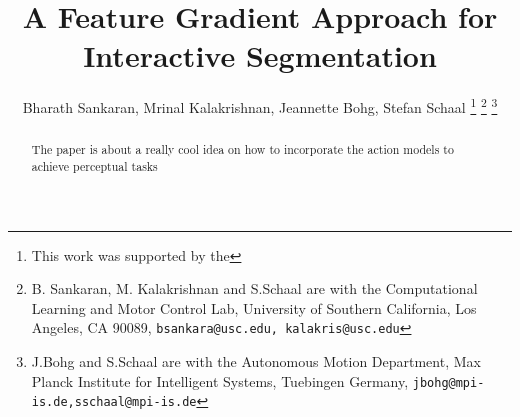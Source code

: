 \documentclass[letterpaper, 10pt, conference]{ieeeconf}
\begin{document}
\title{\LARGE \bf A Feature Gradient Approach for Interactive Segmentation}

\author{Bharath Sankaran, Mrinal Kalakrishnan, Jeannette Bohg, Stefan Schaal%
\thanks{This work was supported by the }%
\thanks{B. Sankaran, M. Kalakrishnan and S.Schaal are with the Computational Learning and Motor Control Lab, University of Southern California, Los Angeles, CA 90089, {\tt\small bsankara@usc.edu, kalakris@usc.edu}}%
\thanks{J.Bohg and S.Schaal are with the Autonomous Motion Department, Max Planck Institute for Intelligent Systems, Tuebingen Germany, {\tt\small jbohg@mpi-is.de,sschaal@mpi-is.de}}%
}
\maketitle


\begin{abstract}
The paper is about a really cool idea on how to incorporate the action models to achieve perceptual tasks
\end{abstract}







%


\end{document}
